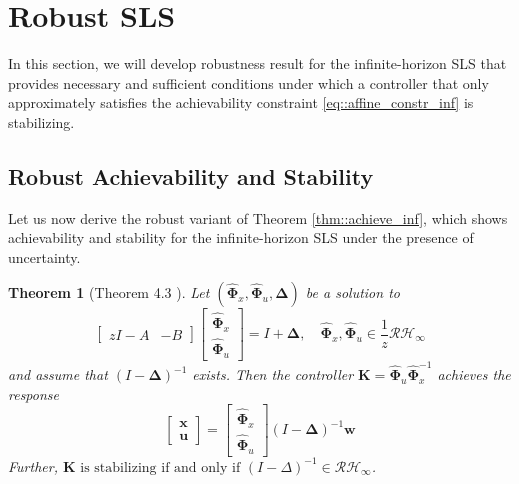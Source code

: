 \documentclass{article}[12pt]
\newtheorem{theorem}{Theorem}
\begin{document}
\section{Robust SLS}
In this section, we will develop robustness result for the infinite-horizon SLS that
provides necessary and sufficient conditions under which a controller that only approximately satisfies the achievability constraint \eqref{eq::affine_constr_inf} is stabilizing.


\subsection{Robust Achievability and Stability}
Let us now derive the robust variant of Theorem \ref{thm::achieve_inf}, which shows achievability and stability for the infinite-horizon SLS under the presence of uncertainty.
\begin{theorem}[Theorem 4.3 \cite{anderson2019system}]
\label{thm::achieve::robust}
Let $\left(\hat{\mathbf{\Phi}}_{x}, \hat{\mathbf{\Phi}}_{u}, \mathbf{\Delta}\right)$ be a solution to
\begin{equation}
\label{achieve::robust}
    \left[\begin{array}{cc}{z I-A} & {-B}\end{array}\right]\left[\begin{array}{c}{\hat{\mathbf{\Phi}}_{x}} \\ {\hat{\mathbf{\Phi}}_{u}}\end{array}\right]=I+\mathbf{\Delta}, \quad \hat{\mathbf{\Phi}}_{x}, \hat{\mathbf{\Phi}}_{u} \in \frac{1}{z} \mathcal{R} \mathcal{H}_{\infty}
\end{equation}
and assume that $(I-\mathbf{\Delta})^{-1}$ exists. Then the controller $\boldsymbol{K}=\hat{\boldsymbol{\Phi}}_{u} \hat{\mathbf{\Phi}}_{x}^{-1}$ achieves the response
\begin{equation}
    \left[\begin{array}{l}{\boldsymbol{x}} \\ {\boldsymbol{u}}\end{array}\right]=\left[\begin{array}{l}{\hat{\boldsymbol{\Phi}}_{x}} \\ {\hat{\boldsymbol{\Phi}}_{u}}\end{array}\right](I-\boldsymbol{\Delta})^{-1} \boldsymbol{w}
\end{equation}
Further, $\mathbf{K} \text { is stabilizing if and only if }(I-\Delta)^{-1} \in \mathcal{R} \mathcal{H}_{\infty}$.
\end{theorem}
\end{document}
